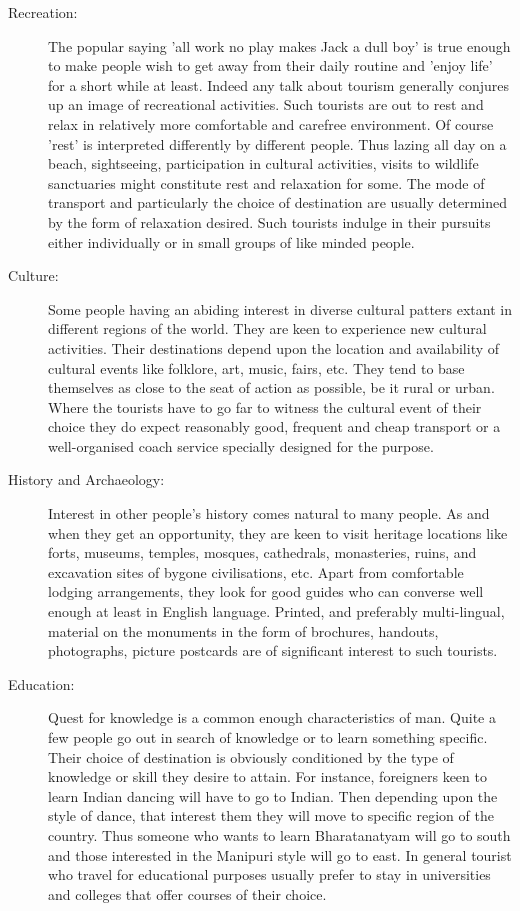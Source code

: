 \begin{description}

  \item[Recreation:] The popular saying 'all work no play makes Jack a dull boy' is true enough to make people wish to get away from their daily routine and 'enjoy life' for a short while at least. Indeed any talk about tourism generally conjures up an image of recreational activities. Such tourists are out to rest and relax in relatively more comfortable and carefree environment. Of course 'rest' is interpreted differently by different people. Thus lazing all day on a beach, sightseeing, participation in cultural activities, visits to wildlife sanctuaries might constitute rest and relaxation for some. The mode of transport and particularly the choice of destination are usually determined by the form of relaxation desired. Such tourists indulge in their pursuits either individually or in small groups of like minded people.

  \item[Culture:] Some people having an abiding interest in diverse cultural patters extant in different regions of the world. They are keen to experience new cultural activities. Their destinations depend upon the location and availability of cultural events like folklore, art, music, fairs, etc. They tend to base themselves as close to the seat of action as possible, be it rural or urban. Where the tourists have to go far to witness the cultural event of their choice they do expect reasonably good, frequent and cheap transport or a well-organised coach service specially designed for the purpose.

  \item[History and Archaeology:] Interest in other people's history comes natural to many people. As and when they get an opportunity, they are keen to visit heritage locations like forts, museums, temples, mosques, cathedrals, monasteries, ruins, and excavation sites of bygone civilisations, etc. Apart from comfortable lodging arrangements, they look for good guides who can converse well enough at least in English language. Printed, and preferably multi-lingual, material on the monuments in the form of brochures, handouts, photographs, picture postcards are of significant interest to such tourists.

  \item[Education:] Quest for knowledge is a common enough characteristics of man. Quite a few people go out in search of knowledge or to learn something specific. Their choice of destination is obviously conditioned by the type of knowledge or skill they desire to attain. For instance, foreigners keen to learn Indian dancing will have to go to Indian. Then depending upon the style of dance, that interest them they will move to specific region of the country. Thus someone who wants to learn Bharatanatyam will go to south and those interested in the Manipuri style will go to east. In general tourist who travel for educational purposes usually prefer to stay in universities and colleges that offer courses of their choice.


\end{description}
